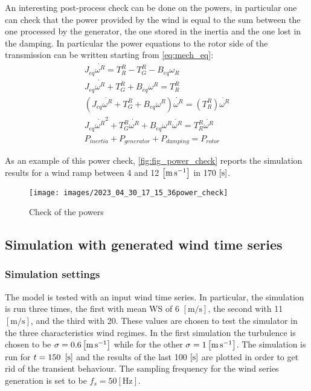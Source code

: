 An interesting post-process check can be done on the powers, in particular one can check that the power provided by the wind is equal to the sum between the one processed by the generator, the one stored in the inertia and the one lost in the damping. In particular the power equations to the rotor side of the transmission can be written starting from \ref{eq:mech_eq}:
\begin{gather}
    J_{eq}\dot{\omega^{R}} = T_R^R - T_G^R-B_{eq}\omega_R\\
    J_{eq}\dot{\omega^{R}} + T_G^R + B_{eq}\omega^R = T_R^R\\
    \left(J_{eq}\dot{\omega^{R}} + T_G^R + B_{eq}\omega^R\right)\dot{\omega^R} = \left(T_R^R\right)\dot{\omega^R}\\
    J_{eq}\dot{\omega^{R}}^2 + T_G^R\dot{\omega^R} + B_{eq}\omega^R\dot{\omega^R} = T_R^R\dot{\omega^R}\\
    P_{inertia} + P_{generator} + P_{damping} = P_{rotor} 
    \label{eq:power_balance}
\end{gather}

As an example of this power check, \autoref{fig:fig_power_check} reports the simulation results for a wind ramp between 4 and 12 $\left[\si{\meter\per\second}\right]$ in 170 $\left[\si{\second}\right]$.
\begin{figure}[htb]
    \centering
    \texttt{[image: images/2023\_04\_30\_17\_15\_36power\_check]}
    \caption{Check of the powers}
    \label{fig:fig_power_check}
\end{figure}

\subsection{Simulation with generated wind time series}\label{sec:wind_series_sim}
\subsubsection{Simulation settings}
The model is tested with an input wind time series. In particular, the simulation is run three times, the first with mean \acrshort{WS} of 6 $\left[\si{\meter\per\second}\right]$, the second with  11 $\left[\si{\meter\per\second}\right]$, and the third with 20. These values are chosen to test the simulator in the three characteristics wind regimes. In the first simulation the turbulence is chosen to be $\sigma=0.6 \left[\si{\meter\per\second}\right]$ while for the other $\sigma=1 \left[\si{\meter\per\second}\right]$. The simulation is run for $t=150\ \mesunt{\second}$ and the results of the last 100 $\left[\si{\second}\right]$ are plotted in order to get rid of the transient behaviour. The sampling frequency for the wind series generation is set to be $f_s=50 \left[\si{\hertz}\right]$.

